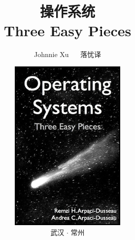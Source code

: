 
\title{{\Huge 操作系统}\\{\LARGE Three Easy Pieces}}
\author{Johnnie Xu ~~ 落忧\hspace{1em}译}
\date{\vspace*{3cm}\centering\includegraphics[totalheight=1.5in]{fig/operating-systems.jpeg}\\武汉 $\cdot$ 常州}
\maketitle
